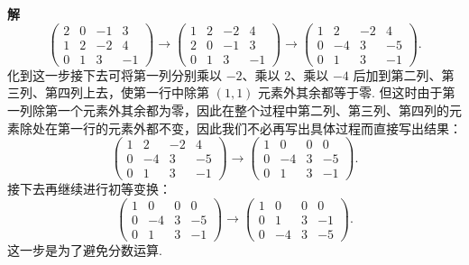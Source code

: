 \documentclass[UTF8,12pt,a4paper,fontset=fandol]{ctexart}
\begin{document}
\noindent\textbf{解}\quad
\[
\left(\begin{array}{cccc}
2 & 0 & -1 & 3\\
1 & 2 & -2 & 4\\
0 & 1 & 3 & -1
\end{array}\right)
\longrightarrow
\left(\begin{array}{cccc}
1 & 2 & -2 & 4\\
2 & 0 & -1 & 3\\
0 & 1 & 3 & -1
\end{array}\right)
\longrightarrow
\left(\begin{array}{cccc}
1 & 2 & -2 & 4\\
0 & -4 & 3 & -5\\
0 & 1 & 3 & -1
\end{array}\right).
\]
化到这一步接下去可将第一列分别乘以 $-2$、乘以 2、乘以 $-4$ 后加到第二列、第三列、第四列上去，使第一行中除第 $(1,1)$ 元素外其余都等于零. 但这时由于第一列除第一个元素外其余都为零，因此在整个过程中第二列、第三列、第四列的元素除处在第一行的元素外都不变，因此我们不必再写出具体过程而直接写出结果：
\[
\left(\begin{array}{cccc}
1 & 2 & -2 & 4\\
0 & -4 & 3 & -5\\
0 & 1 & 3 & -1
\end{array}\right)
\longrightarrow
\left(\begin{array}{cccc}
1 & 0 & 0 & 0\\
0 & -4 & 3 & -5\\
0 & 1 & 3 & -1
\end{array}\right).
\]
接下去再继续进行初等变换：
\[
\left(\begin{array}{cccc}
1 & 0 & 0 & 0\\
0 & -4 & 3 & -5\\
0 & 1 & 3 & -1
\end{array}\right)
\longrightarrow
\left(\begin{array}{cccc}
1 & 0 & 0 & 0\\
0 & 1 & 3 & -1\\
0 & -4 & 3 & -5
\end{array}\right).
\]
这一步是为了避免分数运算.
\end{document}
